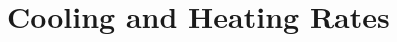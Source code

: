 \documentclass[twocolumn]{aastex61}
\begin{document}
\setcounter{figure}{0}
\section{Cooling and Heating Rates}
\label{appendix:cooling}


\end{document}
